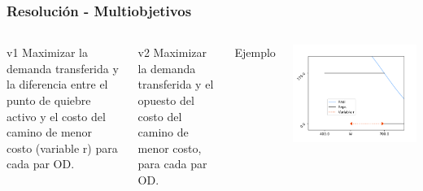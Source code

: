 \documentclass[aspectratio=43, 10pt]{beamer}
\begin{document}
\begin{frame}
    \frametitle{Resolución - Multiobjetivos}

    \begin{columns}[T]
            \begin{block}{v1}
                Maximizar la demanda transferida y la diferencia entre el punto de quiebre activo y el costo del camino de menor costo (variable r) para cada par OD.
            \end{block}
            \begin{block}{v2}
                Maximizar la demanda transferida y el opuesto del costo del camino de menor costo, para cada par OD.
            \end{block}
            Ejemplo

            \vspace{.5cm}
            \includegraphics[width=1.1\textwidth]{images/r_visualization.png}
    \end{columns}
\end{frame}
\end{document}
